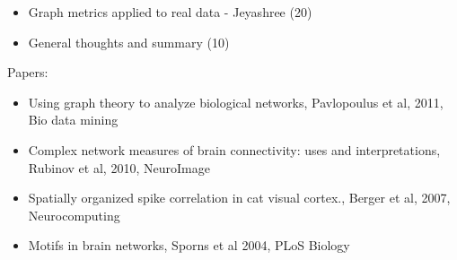 \documentclass[10pt, a4paper,twoside,american]{article}
\begin{document}
\begin{enumerate}[resume]
\begin{itemize}
  \item Graph metrics applied to real data - Jeyashree (20)
  \item General thoughts and summary (10)
  \end{itemize}
  Papers:
  \begin{itemize}
         \item Using graph theory to analyze biological networks, Pavlopoulus et al, 2011, Bio data mining
        \item Complex network measures of brain connectivity: uses and interpretations, Rubinov et al, 2010, NeuroImage
        \item Spatially organized spike correlation in cat visual cortex., Berger et al, 2007, Neurocomputing
        \item Motifs in brain networks, Sporns et al 2004, PLoS Biology
  \end{itemize}



\end{enumerate}
\end{document}
